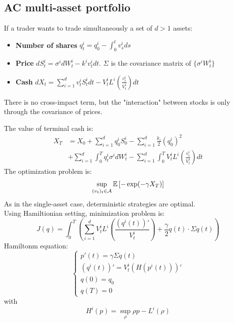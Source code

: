 \subsection{AC multi-asset portfolio}
\begin{mysetting}
If a trader wants to trade simultaneously a set of $d>1$ assets:
\begin{itemize}
	\item \textbf{Number of shares} $q_t^i = q_0^i - \int_{0}^{t}v_s^ids$
	\item \textbf{Price} $dS_t^i = \sigma^i dW_t^i - k^i v_t^idt$. $\Sigma$ is the covariance matrix of $\{ \sigma^i W_t^i\}$
	\item \textbf{Cash} $dX_t = \sum_{i=1}^{d} v_t^i S^i_t dt -V_t^i L^i \left(\frac{v_t^i}{V_t^i}\right)dt$
\end{itemize}
There is no cross-impact term, but the "interaction" between stocks is only through the covariance of prices.
\end{mysetting}
The value of terminal cash is:
\begin{align*}
	X_T & = X_0 + \sum_{i=1}^{d} q_0^i S_0^i - \sum_{i=1}^{d} \frac{k_i}{2}(q_0^i)^2 \\
	& + \sum_{i =1}^{d} \int_{0}^{T} q_t^i \sigma^i dW^i_t - \sum_{i=1}^{d} \int_0^T V_t^i L^i \left(\frac{v_t^i}{V_t^i}\right)dt
\end{align*}
The optimization problem is:
\[
\sup_{(v_t)_t \in \mathcal{A}} \mathbb{E}\left[- \exp(-\gamma X_T)\right]
\]
As in the single-asset case, deterministic strategies are optimal.\\
Using Hamiltionian setting, minimization problem is:
\[
J(q) = \int_{0}^{T} \left(\sum_{i=1}^{d} V_t^i L^i \left(\frac{(q^i(t))'}{V_t^i}\right)  + \frac{\gamma}{2} q(t) \cdot \Sigma q(t)\right)
\]
Hamiltonm equation:
\[
\begin{cases}
	p'(t) = \gamma \Sigma q(t)\\
	(q^i(t))' = V_t^i (H(p^i(t)))'\\
	q(0) = q_0\\
	q(T) = 0	
\end{cases}
\]
with
\[
H^i (p) = \sup_{\rho} \rho p - L^i(\rho)
\]
